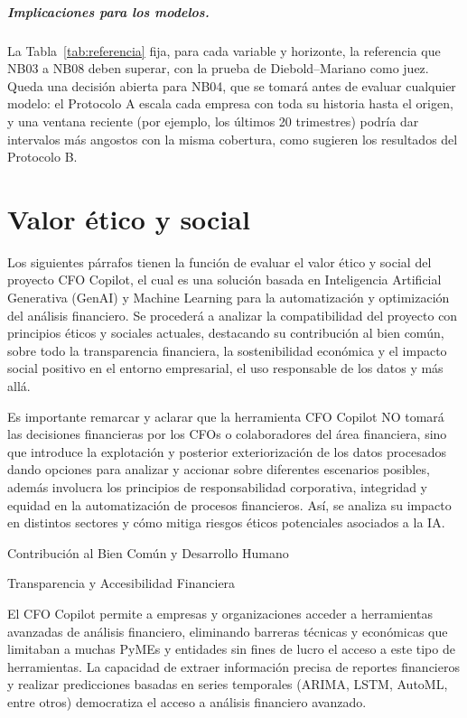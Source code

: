 \documentclass[12pt,letterpaper,oneside]{report}
\renewcommand{\_}{\UnderscoreOriginal\allowbreak}
\begin{document}
\paragraph{Implicaciones para los modelos.} La Tabla~\ref{tab:referencia} fija, para cada variable y horizonte, la referencia que NB03 a NB08 deben superar, con la prueba de Diebold--Mariano como juez. Queda una decisión abierta para NB04, que se tomará antes de evaluar cualquier modelo: el Protocolo A escala cada empresa con toda su historia hasta el origen, y una ventana reciente (por ejemplo, los últimos 20 trimestres) podría dar intervalos más angostos con la misma cobertura, como sugieren los resultados del Protocolo B.

\chapter{Valor ético y social}
Los siguientes párrafos tienen la función de evaluar el valor ético y social del proyecto CFO Copilot, el cual es una solución basada en Inteligencia Artificial Generativa (GenAI) y Machine Learning para la automatización y optimización del análisis financiero. Se procederá a analizar la compatibilidad del proyecto con principios éticos y sociales actuales, destacando su contribución al bien común, sobre todo la transparencia financiera, la sostenibilidad económica y el impacto social positivo en el entorno empresarial, el uso responsable de los datos y más allá.

Es importante remarcar y aclarar que la herramienta CFO Copilot NO tomará las decisiones financieras por los CFOs o colaboradores del área financiera, sino que introduce la explotación y posterior exteriorización de los datos procesados dando opciones para analizar y accionar sobre diferentes escenarios posibles, además involucra los principios de responsabilidad corporativa, integridad y equidad en la automatización de procesos financieros. Así, se analiza su impacto en distintos sectores y cómo mitiga riesgos éticos potenciales asociados a la IA.

Contribución al Bien Común y Desarrollo Humano

Transparencia y Accesibilidad Financiera

El CFO Copilot permite a empresas y organizaciones acceder a herramientas avanzadas de análisis financiero, eliminando barreras técnicas y económicas que limitaban a muchas PyMEs y entidades sin fines de lucro el acceso a este tipo de herramientas. La capacidad de extraer información precisa de reportes financieros y realizar predicciones basadas en series temporales (ARIMA, LSTM, AutoML, entre otros) democratiza el acceso a análisis financiero avanzado.
\end{document}
